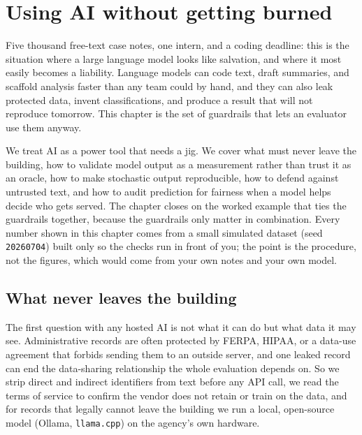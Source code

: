 \documentclass[
    a4paper,
    fontsize=10pt,
    twoside=true,
    numbers=noenddot,
]{kaobook}
\begin{document}

\chapter{Using AI without getting burned}\label{ch:ai}

Five thousand free-text case notes, one intern, and a coding deadline: this is the situation where a large language model looks like salvation, and where it most easily becomes a liability. Language models can code text, draft summaries, and scaffold analysis faster than any team could by hand, and they can also leak protected data, invent classifications, and produce a result that will not reproduce tomorrow. This chapter is the set of guardrails that lets an evaluator use them anyway.

We treat AI as a power tool that needs a jig. We cover what must never leave the building, how to validate model output as a measurement rather than trust it as an oracle, how to make stochastic output reproducible, how to defend against untrusted text, and how to audit prediction for fairness when a model helps decide who gets served. The chapter closes on the worked example that ties the guardrails together, because the guardrails only matter in combination. Every number shown in this chapter comes from a small simulated dataset (seed \texttt{20260704}) built only so the checks run in front of you; the point is the procedure, not the figures, which would come from your own notes and your own model.

\section{What never leaves the building}
The first question with any hosted AI is not what it can do but what data it may see. Administrative records are often protected by FERPA, HIPAA, or a data-use agreement that forbids sending them to an outside server, and one leaked record can end the data-sharing relationship the whole evaluation depends on. So we strip direct and indirect identifiers from text before any API call, we read the terms of service to confirm the vendor does not retain or train on the data, and for records that legally cannot leave the building we run a local, open-source model (Ollama, \texttt{llama.cpp}) on the agency's own hardware.
\end{document}
